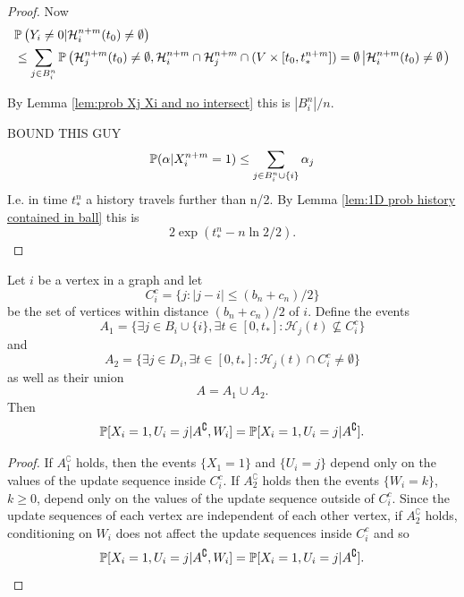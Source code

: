 \begin{proof}
		Now 
		\begin{align}
			&\mathbb{P}\left(Y_i \neq 0 | \mathcal{H}_i^{n+m}(t_0) \neq \emptyset \right) \\
			&\leq \sum_{j \in B_i^n} \mathbb{P}\left(\mathcal{H}_j^{n+m}(t_0) \neq \emptyset, \mathcal{H}_i^{n+m} \cap \mathcal{H}_j^{n+m} \cap (V \times [t_0, t_*^{n+m}]) = \emptyset \left| \mathcal{H}_i^{n+m}(t_0) \neq \emptyset \right.\right)
		\end{align}

		By Lemma \ref{lem:prob Xj Xi and no intersect} this is $|B_i^n|/n$. 


		BOUND THIS GUY
		\begin{equation}
			\mathbb{P}(\alpha | X_i^{n+m} = 1) \leq \sum_{j \in B_i^n \cup \{i\}} \alpha_j
		\end{equation}
		I.e. in time $t_*^n$ a history travels further than n/2. By Lemma \ref{lem:1D prob history contained in ball} this is
		\begin{equation}
			2\exp(t_*^n - n\ln 2 / 2).
		\end{equation}

	\end{proof}

	\begin{lemma}
	\label{lem:conditioning on A removes conditioning on W}
		Let $i$ be a vertex in a graph and let
		\begin{equation}
			C_i^c = \{j : |j - i| \leq (b_n + c_n)/2\}
		\end{equation}
		be the set of vertices within distance $(b_n + c_n)/2$ of $i$. Define the events
		\begin{equation}
			A_1 = \{\exists j \in B_i \cup \{i\}, \exists t \in [0, t_*] : \mathcal{H}_j(t) \nsubseteq  C_i^c\}
		\end{equation}
		and
		\begin{equation}
			A_2 = \{\exists j \in D_i, \exists t \in [0, t_*] : \mathcal{H}_j(t) \cap C_i^c \neq \emptyset\}
		\end{equation}
		as well as their union
		\begin{equation}
			A = A_1 \cup A_2.
		\end{equation}
		Then
		\begin{equation}
			\mathbb{P}[X_i = 1, U_i = j | A^\complement, W_i] = \mathbb{P}[X_i = 1, U_i = j | A^\complement].
		\end{equation}
	\end{lemma}
	\begin{proof}
		If $A_1^\complement$ holds, then the events $\{X_1 = 1\}$ and $\{U_i = j\}$ depend only on the values of the update sequence inside $C_i^c$. If $A_2^\complement$ holds then the events $\{W_i = k\}$, $k \geq 0$, depend only on the values of the update sequence outside of $C_i^c$. Since the update sequences of each vertex are independent of each other vertex, if $A_2^\complement$ holds, conditioning on $W_i$ does not affect the update sequences inside $C_i^c$ and so 
		\begin{equation}
			\mathbb{P}[X_i = 1, U_i = j | A^\complement, W_i] = \mathbb{P}[X_i = 1, U_i = j | A^\complement].
		\end{equation}
	\end{proof}


